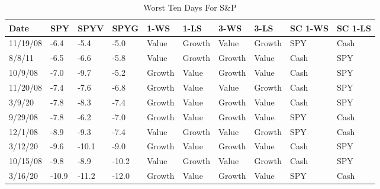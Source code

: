 \documentclass{article}
\begin{document}
\begin{table}[!ht]
    \centering
    \caption{Worst Ten Days For S\&P}
    \begin{tabular}{|l|l|l|l|l|l|l|l|l|l|}
    \hline
        Date & SPY & SPYV & SPYG & 1-WS & 1-LS & 3-WS & 3-LS & SC 1-WS & SC 1-LS \\ \hline
        11/19/08 & -6.4 & -5.4 & -5.0 & Value & Growth & Value & Growth & SPY & Cash \\ \hline
        8/8/11 & -6.5 & -6.6 & -5.8 & Value & Growth & Growth & Value & Cash & SPY \\ \hline
        10/9/08 & -7.0 & -9.7 & -5.2 & Growth & Value & Growth & Value & Cash & SPY \\ \hline
        11/20/08 & -7.4 & -7.6 & -6.8 & Growth & Value & Value & Growth & Cash & SPY \\ \hline
        3/9/20 & -7.8 & -8.3 & -7.4 & Growth & Value & Growth & Value & Cash & SPY \\ \hline
        9/29/08 & -7.8 & -6.2 & -7.0 & Growth & Value & Growth & Value & SPY & Cash \\ \hline
        12/1/08 & -8.9 & -9.3 & -7.4 & Value & Growth & Value & Growth & SPY & Cash \\ \hline
        3/12/20 & -9.6 & -10.1 & -9.0 & Growth & Value & Growth & Value & Cash & SPY \\ \hline
        10/15/08 & -9.8 & -8.9 & -10.2 & Value & Growth & Value & Growth & Cash & SPY \\ \hline
        3/16/20 & -10.9 & -11.2 & -12.0 & Growth & Value & Growth & Value & SPY & Cash \\ \hline
    \end{tabular}
\end{table}
\end{document}
